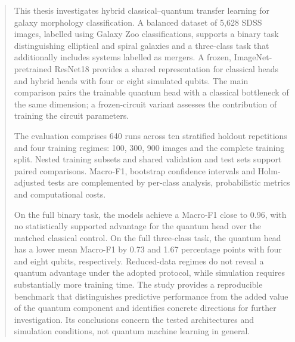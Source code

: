 \begin{abstract}
This thesis investigates hybrid classical--quantum transfer learning
for galaxy morphology classification. A balanced dataset of 5,628
SDSS images, labelled using Galaxy Zoo classifications, supports a
binary task distinguishing elliptical and spiral galaxies and a
three-class task that additionally includes systems labelled as mergers.
A frozen, ImageNet-pretrained ResNet18 provides a shared representation
for classical heads and hybrid heads with four or eight simulated qubits.
The main comparison pairs the trainable quantum head with a classical
bottleneck of the same dimension; a frozen-circuit variant assesses the
contribution of training the circuit parameters.

The evaluation comprises 640 runs across ten stratified holdout
repetitions and four training regimes: 100, 300, 900 images and the
complete training split. Nested training subsets and shared validation
and test sets support paired comparisons. Macro-F1, bootstrap confidence
intervals and Holm-adjusted tests are complemented by per-class analysis,
probabilistic metrics and computational costs.

On the full binary task, the models achieve a Macro-F1 close to 0.96,
with no statistically supported advantage for the quantum head over the
matched classical control. On the full three-class task, the quantum
head has a lower mean Macro-F1 by 0.73 and 1.67 percentage points with
four and eight qubits, respectively. Reduced-data regimes do not reveal
a quantum advantage under the adopted protocol, while simulation requires
substantially more training time. The study provides a reproducible
benchmark that distinguishes predictive performance from the added
value of the quantum component and identifies concrete directions for
further investigation. Its conclusions concern the tested architectures
and simulation conditions, not quantum machine learning in general.
\end{abstract}
